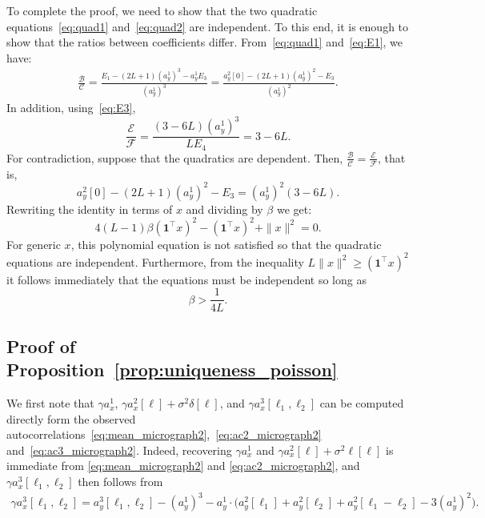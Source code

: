 \documentclass[12pt]{article}
\newcommand{\1}{\mathbf{1}}
\theoremstyle{plain}
\theoremstyle{definition}
\theoremstyle{remark}
\theoremstyle{plain}
\theoremstyle{remark}
\theoremstyle{plain}
\theoremstyle{plain}
\theoremstyle{plain}
\numberwithin{equation}{section}
\begin{document}
To complete the proof, we need to show that the two quadratic equations~\eqref{eq:quad1} and~\eqref{eq:quad2} are independent. To this end, it is enough to show that the ratios between coefficients differ. 
From~\eqref{eq:quad1} and~\eqref{eq:E1}, we have:
\begin{equation*}
\begin{split}
\frac{\mathcal{B}}{\mathcal{C}} = \frac{E_1 - (2L+1)(a_y^1)^3 - a_y^1E_3}{(a_y^1)^3} = \frac{a_y^2[0] - (2L+1)(a_y^1)^2 - E_3}{(a_y^1)^2}.
\end{split}
\end{equation*}
In addition, using~\eqref{eq:E3},
\begin{equation*}
\frac{\mathcal{E}}{\mathcal{F}} = \frac{(3-6L)(a_y^1)^3}{LE_4} = 3 - 6L . 
\end{equation*}
For contradiction, suppose that the quadratics are dependent. Then, $\frac{\mathcal{B}}{\mathcal{C}} =\frac{\mathcal{E}}{\mathcal{F}} $, that is, 	
\begin{equation*}
a_y^2[0] - (2L+1)(a_y^1)^2 - E_3 = (a_y^1)^2(3-6L).
\end{equation*}
Rewriting the identity in terms of $x$ and dividing by $\beta$ we get:
\begin{equation} \label{eq:cond}
4(L-1)\beta (\1^\top x)^2  - (\1^\top x)^2 + \|x\|^2 = 0.
\end{equation}	
For generic $x$,  this polynomial equation is not satisfied so that the quadratic equations are independent. 
Furthermore, from the inequality $L\|x\|^2 \ge (\1^\top x)^2$ it follows immediately that the equations must be independent so long as
\begin{equation*}
\beta > \frac{1}{4L}.
\end{equation*}


\subsection{Proof of Proposition~\ref{prop:uniqueness_poisson}} \label{sec:proof_uniqueness_poisson}


We first note that $\gamma a_x^1$, $\gamma a_x^2[\ell] + \sigma^2 \delta[\ell]$, and $\gamma a_x^3[\ell_1,\ell_2]$ can be computed directly form the observed autocorrelations~\eqref{eq:mean_micrograph2},~\eqref{eq:ac2_micrograph2} and~\eqref{eq:ac3_micrograph2}.
Indeed, recovering  $\gamma a_x^1$ and $\gamma a_x^2[\ell] + \sigma^2 \ell[\ell]$ is immediate from \eqref{eq:mean_micrograph2} and \eqref{eq:ac2_micrograph2}, and $\gamma a_x^3[\ell_1,\ell_2]$ then follows from
%
\begin{align}
\gamma a_x^3[\ell_1,\ell_2]
= a_y^3[\ell_1,\ell_2] - (a_y^1)^3
- a_y^1 \cdot \big(a_y^2[\ell_1]  
+ a_y^2[\ell_2] + a_y^2[\ell_1-\ell_2]- 3(a_y^1)^2 \big).
\end{align}
\end{document}
